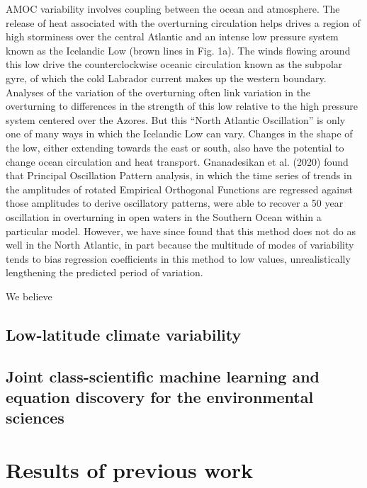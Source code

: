 \documentclass{article}
\begin{document}
AMOC variability involves coupling between the ocean and atmosphere. The release of heat associated with the overturning circulation helps drives a region of high storminess over the central Atlantic and an intense low pressure system known as the Icelandic Low (brown lines in Fig. 1a). The winds flowing around this low drive the counterclockwise oceanic circulation known as the subpolar gyre, of which the cold Labrador current makes up the western boundary. Analyses of the variation of the overturning often link variation in the overturning to differences in the strength of this low relative to the high pressure system centered over the Azores. But this “North Atlantic Oscillation” is only one of many ways in which the Icelandic Low can vary. Changes in the shape of the low, either extending towards the east or south, also have the potential to change ocean circulation and heat transport.  Gnanadesikan et al. (2020) found that Principal Oscillation Pattern analysis, in which the time series of trends in the amplitudes of rotated Empirical Orthogonal Functions are regressed against those amplitudes to derive oscillatory patterns, were able to recover a 50 year oscillation in overturning in open waters in the Southern Ocean within a particular model. However, we have since found that this method does not do as well in the North Atlantic, in part because the multitude of modes of variability tends to bias regression coefficients in this method to low values, unrealistically lengthening the predicted period of variation.  

We believe  

 

\subsection{Low-latitude climate variability} 

 

 

\subsection{Joint class-scientific machine learning and equation discovery for the environmental sciences} 

 

\section{Results of previous work} 
\end{document}
